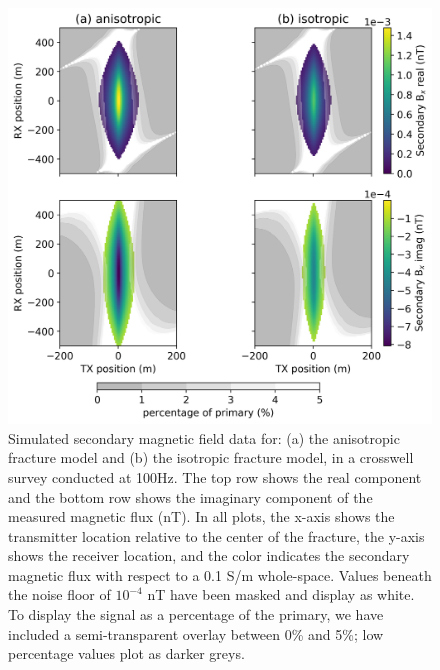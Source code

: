 \begin{figure}
    \begin{center}
    \includegraphics[width=\textwidth]{figures/phys_prop_model/crosswell_data100.png}
    \end{center}
\caption{
    Simulated secondary magnetic field data for: (a) the anisotropic fracture model and
    (b) the isotropic fracture model, in a crosswell survey conducted at 100Hz.
    The top row shows the real component and the bottom row shows
    the imaginary component of the measured magnetic flux (nT).
    In all plots, the x-axis shows the transmitter location relative to the center
    of the fracture, the y-axis shows the receiver location, and the color indicates the secondary
    magnetic flux with respect to a 0.1 S/m whole-space. Values beneath the noise floor of $10^{-4}$ nT
    have been masked and display as white. To display the signal as a percentage of the primary, we have
    included a semi-transparent overlay between 0\% and 5\%; low percentage values plot as darker
    greys.
}
\label{fig:crosswell_data100}
\end{figure}
